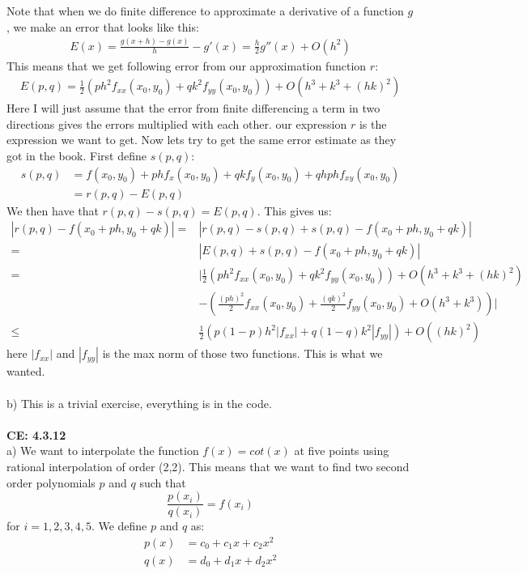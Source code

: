 \documentclass[11pt,a4paper]{report}
\begin{document}
Note that when we do finite difference to approximate a derivative of a function $g$, we make an error that looks like this:
\begin{align*}
E(x)=\frac{g(x+h)-g(x)}{h}-g'(x) = \frac{h}{2}g''(x) + O(h^2)
\end{align*} 
This means that we get following error from our approximation function $r$:
\begin{align*}
E(p,q) = \frac{1}{2}(ph^2f_{xx}(x_0,y_0)+qk^2f_{yy}(x_0,y_0)) +O(h^3+k^3+(hk)^2) 
\end{align*}
Here I will just assume that the error from finite differencing a term in two directions gives the errors multiplied with each other. our expression $r$ is the expression we want to get. Now lets try to get the same error estimate as they got in the book. First define $s(p,q)$:
\begin{align*}
s(p,q)&= f(x_0,y_0) + phf_x(x_0,y_0)+qkf_y(x_0,y_0)
+qhphf_{xy}(x_0,y_0) \\
&=r(p,q)-E(p,q)
\end{align*}
We then have that $r(p,q)-s(p,q)=E(p,q)$. This gives us:
\begin{align*}
|r(p,q)-f(x_0+ph,y_0+qk)| = &|r(p,q)-s(p,q)+s(p,q)-f(x_0+ph,y_0+qk)| \\
=&|E(p,q)+s(p,q)-f(x_0+ph,y_0+qk)| \\
=&|\frac{1}{2}(ph^2f_{xx}(x_0,y_0)+qk^2f_{yy}(x_0,y_0)) +O(h^3+k^3+(hk)^2)\\
&-(\frac{(ph)^2}{2}f_{xx}(x_0,y_0)+\frac{(qk)^2}{2}f_{yy}(x_0,y_0) +O(h^3+k^3))| \\
\leq &\frac{1}{2}(p(1-p)h^2|f_{xx}|+q(1-q)k^2|f_{yy}|)+ O((hk)^2)
\end{align*}
here $|f_{xx}|$ and $|f_{yy}|$ is the max norm of those two functions. This is what we wanted.
\\
\\
b) This is a trivial exercise, everything is in the code.
\\
\\
\textbf{CE: 4.3.12}
\\
a) We want to interpolate the function $f(x)=cot(x)$ at five points using rational interpolation of order (2,2). This means that we want to find two second order polynomials $p$ and $q$ such that $$\frac{p(x_i)}{q(x_i)}=f(x_i) $$ for $i=1,2,3,4,5$. We define $p$ and $q$ as: 
\begin{align*}
p(x) &= c_0+c_1x+c_2x^2 \\
q(x) &= d_0+d_1x+d_2x^2
\end{align*} 
\end{document}
